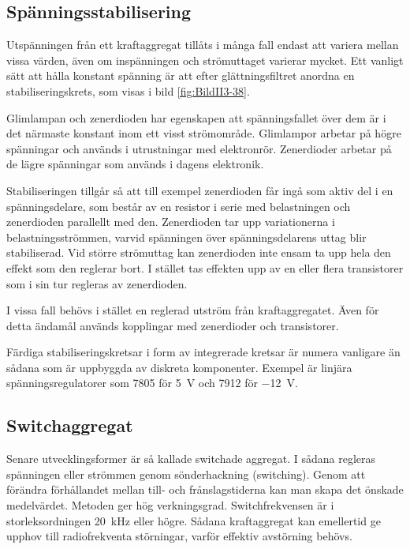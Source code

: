 
\subsection{Spänningsstabilisering}

Utspänningen från ett kraftaggregat tillåts i många fall endast att variera
mellan vissa värden, även om inspänningen och strömuttaget varierar mycket.
Ett vanligt sätt att hålla konstant spänning är att efter glättningsfiltret anordna en stabiliseringskrets, som visas i bild \ref{fig:BildII3-38}.

Glimlampan och zenerdioden har egenskapen att spänningsfallet över dem är i det
närmaste konstant inom ett visst strömområde.
Glimlampor arbetar på högre spänningar och används i utrustningar med
elektronrör.
Zenerdioder arbetar på de lägre spänningar som används i dagens elektronik.

Stabiliseringen tillgår så att till exempel zenerdioden får ingå som aktiv del
i en spänningsdelare, som består av en resistor i serie med belastningen och
zenerdioden parallellt med den.
Zenerdioden tar upp variationerna i belastningsströmmen, varvid spänningen över
spänningsdelarens uttag blir stabiliserad.
Vid större strömuttag kan zenerdioden inte ensam ta upp hela den effekt som den
reglerar bort.
I stället tas effekten upp av en eller flera transistorer som i sin tur
regleras av zenerdioden.

I vissa fall behövs i stället en reglerad utström från kraftaggregatet.
Även för detta ändamål används kopplingar med zenerdioder och transistorer.

Färdiga stabiliseringskretsar i form av integrerade kretsar är numera vanligare
än sådana som är uppbyggda av diskreta komponenter.
Exempel är linjära spänningsregulatorer som 7805 för \SI{5}{\volt} och 7912 för
\SI{-12}{\volt}.

\subsection{Switchaggregat}

Senare utvecklingsformer är så kallade switchade aggregat.
I sådana regleras spänningen eller strömmen genom sönderhackning (switching).
Genom att förändra förhållandet mellan till- och frånslagstiderna kan man skapa
det önskade medelvärdet.
Metoden ger hög verkningsgrad.
Switchfrekvensen är i storleksordningen \SI{20}{\kilo\hertz} eller högre.
Sådana kraftaggregat kan emellertid ge upphov till radiofrekventa störningar, varför effektiv avstörning
behövs.

